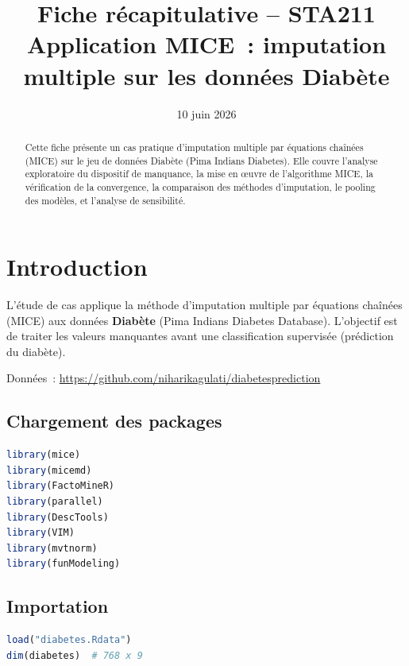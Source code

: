 \documentclass[a4paper,11pt]{article}
\title{\textbf{Fiche r\'ecapitulative -- STA211}\\[4pt]
\large Application MICE~: imputation multiple sur les donn\'ees Diab\`ete}
\author{}
\date{10 juin 2026}
\theoremstyle{definition}
\theoremstyle{remark}
\begin{document}
\maketitle
\thispagestyle{empty}

\begin{abstract}
Cette fiche pr\'esente un cas pratique d'imputation multiple par
\'equations cha\^{i}n\'ees (MICE) sur le jeu de donn\'ees Diab\`ete
(Pima Indians Diabetes). Elle couvre l'analyse exploratoire du
dispositif de manquance, la mise en \oe uvre de l'algorithme MICE,
la v\'erification de la convergence, la comparaison des m\'ethodes
d'imputation, le pooling des mod\`eles, et l'analyse de sensibilit\'e.
\end{abstract}

\vfill
\tableofcontents
\newpage

\section{Introduction}

L'\'etude de cas applique la m\'ethode d'imputation multiple par
\'equations cha\^{i}n\'ees (MICE) aux donn\'ees \textbf{Diab\`ete}
(Pima Indians Diabetes Database). L'objectif est de traiter les
valeurs manquantes avant une classification supervis\'ee (pr\'ediction
du diab\`ete).

Donn\'ees~: \url{https://github.com/niharikagulati/diabetesprediction}

\subsection{Chargement des packages}

\begin{lstlisting}[language=R]
library(mice)
library(micemd)
library(FactoMineR)
library(parallel)
library(DescTools)
library(VIM)
library(mvtnorm)
library(funModeling)
\end{lstlisting}

\subsection{Importation}

\begin{lstlisting}[language=R]
load("diabetes.Rdata")
dim(diabetes)  # 768 x 9
\end{lstlisting}
\end{document}
